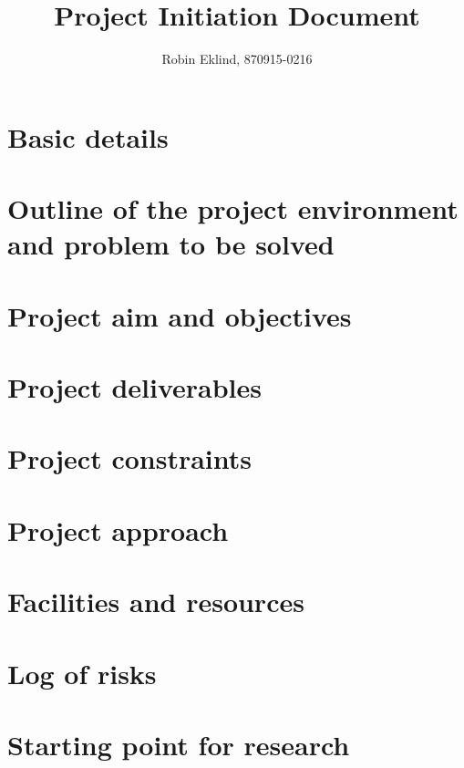 \documentclass[12pt, a4paper]{article}
\title{Project Initiation Document\\ \textit{\large{\todo{Draft Project Title}}}}
\author{Robin Eklind, 870915-0216}
\begin{document}
\maketitle

\section{Basic details}


\section{Outline of the project environment and problem to be solved}


\section{Project aim and objectives}


\section{Project deliverables}


\section{Project constraints}


\section{Project approach}


\section{Facilities and resources}


\section{Log of risks}


\section{Starting point for research}
\end{document}
